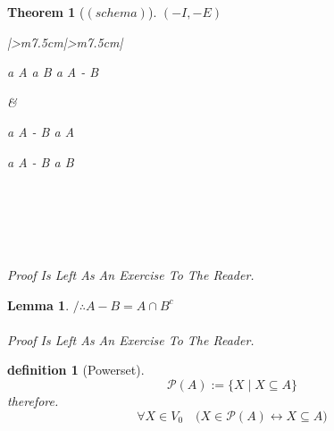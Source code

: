 \documentclass[10pt,a4paper]{book}
\newtheorem{definition}{definition}[section]
\newtheorem{theorem}{Theorem}[section]
\newtheorem{lemma}{Lemma}[section]
\begin{document}
\begin{theorem}
    [$(schema)$] $(- I , - E )$

    \begin{tabular}{|>{\centering\arraybackslash}m{7.5cm}|>{\centering\arraybackslash}m{7.5cm}|}
        \hline
        \begin{fitchproof}[arrayenv=tabular]
             {a \in A  }
             {a \notin B  }
             {\therefore  a \in A - B } 
        \end{fitchproof}
        \rule[0pt]{0pt}{0pt}  \rule[0pt]{0pt}{0pt} &
        \begin{minipage}[t]{\linewidth}
            \centering
            \begin{minipage}[t]{0.48\linewidth}
                \begin{fitchproof}[arrayenv=tabular]
                     {a \in  A - B  }
                     {\therefore  a \in  A} 
                \end{fitchproof}
            \end{minipage}
            \begin{minipage}[t]{0.48\linewidth}
                \begin{fitchproof}[arrayenv=tabular]
                     {a \in  A - B  }
                     {  \therefore  a \notin  B  } 
                \end{fitchproof}
            \end{minipage}
        \end{minipage}

        \\
        \hline
    \end{tabular}
    \\
    \\
    \\
    Proof Is Left As An Exercise To The Reader.
\end{theorem}

\begin{lemma}
    $/ \therefore  A - B = A \cap B^c$
    \\
    \\
    Proof Is Left As An Exercise To The Reader.
\end{lemma}


\begin{definition}
    [Powerset]
    \[ \mathcal{P}(A):=\{X \mid X \subseteq A \} \]
    therefore.
    \[\forall X \in V_0 \quad  \Big( X \in \mathcal{P}(A) \leftrightarrow    X \subseteq A \Big) \]
\end{definition}
\end{document}
